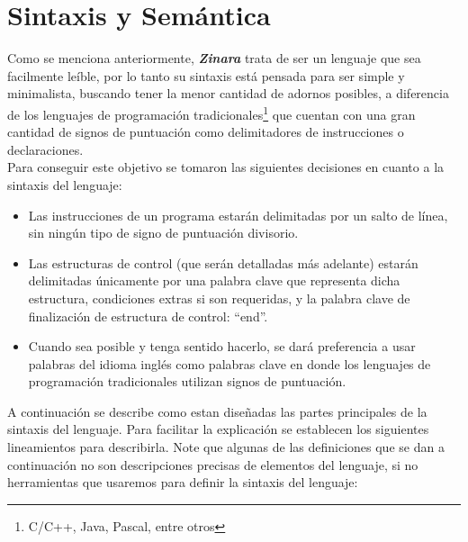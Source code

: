 \documentclass[12pt, spanish]{report}
\begin{document}
 

\section{Sintaxis y Sem\'antica}
\label{sec:synsem}

Como se menciona anteriormente, \emph{\textbf{Zinara}} trata de ser un
lenguaje que sea facilmente le\'ible, por lo tanto su sintaxis est\'a
pensada para ser simple y minimalista, buscando tener la menor
cantidad de adornos posibles, a diferencia de los lenguajes de
programaci\'on tradicionales\footnote{C/C++, Java, Pascal, entre
  otros} que cuentan con una gran cantidad de signos de puntuaci\'on
como delimitadores de instrucciones o declaraciones.\\

Para conseguir este objetivo se tomaron las siguientes decisiones en
cuanto a la sintaxis del lenguaje:

\begin{itemize}
\item Las instrucciones de un programa estar\'an delimitadas por un
  salto de l\'inea, sin ning\'un tipo de signo de puntuaci\'on
  divisorio.

\item Las estructuras de control (que ser\'an detalladas m\'as
  adelante) estar\'an delimitadas \'unicamente por una palabra clave
  que representa dicha estructura, condiciones extras si son
  requeridas, y la palabra clave de finalizaci\'on de estructura de
  control: ``end''.

\item Cuando sea posible y tenga sentido hacerlo, se dar\'a
  preferencia a usar palabras del idioma ingl\'es como palabras clave
  en donde los lenguajes de programaci\'on tradicionales utilizan
  signos de puntuaci\'on.
\end{itemize}

A continuaci\'on se describe como estan dise\~nadas las partes
principales de la sintaxis del lenguaje. Para facilitar la
explicaci\'on se establecen los siguientes lineamientos para
describirla. Note que algunas de las definiciones que se dan a
continuaci\'on no son descripciones precisas de elementos del
lenguaje, si no herramientas que usaremos para definir la sintaxis del
lenguaje:
\end{document}
